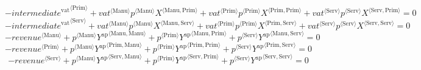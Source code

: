\begin{equation}
-{{i\!n\!t\!e\!r\!m\!e\!d\!i\!a\!t\!e}^{\mathrm{vat}}}^{\langle \mathrm{Prim}\rangle} + {{{v\!a\!t}}^{\langle \mathrm{\mathrm{Manu}}\rangle}} {{p}^{\langle \mathrm{Manu}\rangle}} {{X}^{\langle \mathrm{Manu},\mathrm{Prim}\rangle}} + {{{v\!a\!t}}^{\langle \mathrm{\mathrm{Prim}}\rangle}} {{p}^{\langle \mathrm{Prim}\rangle}} {{X}^{\langle \mathrm{Prim},\mathrm{Prim}\rangle}} + {{{v\!a\!t}}^{\langle \mathrm{\mathrm{Serv}}\rangle}} {{p}^{\langle \mathrm{Serv}\rangle}} {{X}^{\langle \mathrm{Serv},\mathrm{Prim}\rangle}} = 0
\end{equation}
\begin{equation}
-{{i\!n\!t\!e\!r\!m\!e\!d\!i\!a\!t\!e}^{\mathrm{vat}}}^{\langle \mathrm{Serv}\rangle} + {{{v\!a\!t}}^{\langle \mathrm{\mathrm{Manu}}\rangle}} {{p}^{\langle \mathrm{Manu}\rangle}} {{X}^{\langle \mathrm{Manu},\mathrm{Serv}\rangle}} + {{{v\!a\!t}}^{\langle \mathrm{\mathrm{Prim}}\rangle}} {{p}^{\langle \mathrm{Prim}\rangle}} {{X}^{\langle \mathrm{Prim},\mathrm{Serv}\rangle}} + {{{v\!a\!t}}^{\langle \mathrm{\mathrm{Serv}}\rangle}} {{p}^{\langle \mathrm{Serv}\rangle}} {{X}^{\langle \mathrm{Serv},\mathrm{Serv}\rangle}} = 0
\end{equation}
\begin{equation}
-{{r\!e\!v\!e\!n\!u\!e}}^{\langle \mathrm{Manu}\rangle} + {{p}^{\langle \mathrm{Manu}\rangle}} {{Y^{\mathrm{ap}}}^{\langle \mathrm{Manu},\mathrm{Manu}\rangle}} + {{p}^{\langle \mathrm{Prim}\rangle}} {{Y^{\mathrm{ap}}}^{\langle \mathrm{Manu},\mathrm{Prim}\rangle}} + {{p}^{\langle \mathrm{Serv}\rangle}} {{Y^{\mathrm{ap}}}^{\langle \mathrm{Manu},\mathrm{Serv}\rangle}} = 0
\end{equation}
\begin{equation}
-{{r\!e\!v\!e\!n\!u\!e}}^{\langle \mathrm{Prim}\rangle} + {{p}^{\langle \mathrm{Manu}\rangle}} {{Y^{\mathrm{ap}}}^{\langle \mathrm{Prim},\mathrm{Manu}\rangle}} + {{p}^{\langle \mathrm{Prim}\rangle}} {{Y^{\mathrm{ap}}}^{\langle \mathrm{Prim},\mathrm{Prim}\rangle}} + {{p}^{\langle \mathrm{Serv}\rangle}} {{Y^{\mathrm{ap}}}^{\langle \mathrm{Prim},\mathrm{Serv}\rangle}} = 0
\end{equation}
\begin{equation}
-{{r\!e\!v\!e\!n\!u\!e}}^{\langle \mathrm{Serv}\rangle} + {{p}^{\langle \mathrm{Manu}\rangle}} {{Y^{\mathrm{ap}}}^{\langle \mathrm{Serv},\mathrm{Manu}\rangle}} + {{p}^{\langle \mathrm{Prim}\rangle}} {{Y^{\mathrm{ap}}}^{\langle \mathrm{Serv},\mathrm{Prim}\rangle}} + {{p}^{\langle \mathrm{Serv}\rangle}} {{Y^{\mathrm{ap}}}^{\langle \mathrm{Serv},\mathrm{Serv}\rangle}} = 0
\end{equation}
